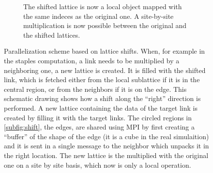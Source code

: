\begin{figure}[hbt!]
\begin{subfigure}{\textwidth}
        \caption{The shifted lattice is now a local object mapped with the same indeces as the original one. A site-by-site multiplication is now possible between the original and the shifted lattices.}
    \end{subfigure}
    \caption{Parallelization scheme based on lattice shifts. When, for example in the staples computation, a link needs to be multiplied by a neighboring one, a new lattice is created. It is filled with the shifted link, which is fetched either from the local sublattice if it is in the central region, or from the neighbors if it is on the edge. This schematic drawing shows how a shift along the ``right'' direction is performed. A new lattice containing the data of the target link is created by filling it with the target links. The circled regions in \cref{subfig:shift}, the edges, are shared using MPI by first creating a ``buffer'' of the shape of the edge (it is a cube in the real simulaition) and it is sent in a single message to the neighbor which unpacks it in the right location. The new lattice is the multiplied with the original one on a site by site basis, which now is only a local operation.}
    \label{fig:shift}
\end{figure}